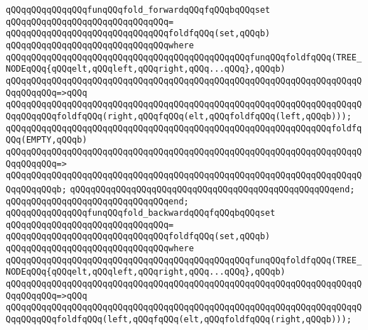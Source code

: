 \verb|qQQqqQQqqQQqqQQqfunqQQqfold_forwardqQQqfqQQqbqQQqset|\newline
\verb|qQQqqQQqqQQqqQQqqQQqqQQqqQQqqQQq=|\newline
\verb|qQQqqQQqqQQqqQQqqQQqqQQqqQQqqQQqfoldfqQQq(set,qQQqb)|\newline
\verb|qQQqqQQqqQQqqQQqqQQqqQQqqQQqqQQqwhere|\newline
\verb|qQQqqQQqqQQqqQQqqQQqqQQqqQQqqQQqqQQqqQQqqQQqqQQqfunqQQqfoldfqQQq(TREE_NODEqQQq{qQQqelt,qQQqleft,qQQqright,qQQq...qQQq},qQQqb)|\newline
\verb|qQQqqQQqqQQqqQQqqQQqqQQqqQQqqQQqqQQqqQQqqQQqqQQqqQQqqQQqqQQqqQQqqQQqqQQqqQQqqQQq=>qQQq|\newline
\verb|qQQqqQQqqQQqqQQqqQQqqQQqqQQqqQQqqQQqqQQqqQQqqQQqqQQqqQQqqQQqqQQqqQQqqQQqqQQqqQQqfoldfqQQq(right,qQQqfqQQq(elt,qQQqfoldfqQQq(left,qQQqb)));|\newline
\newline
\verb|qQQqqQQqqQQqqQQqqQQqqQQqqQQqqQQqqQQqqQQqqQQqqQQqqQQqqQQqqQQqqQQqfoldfqQQq(EMPTY,qQQqb)|\newline
\verb|qQQqqQQqqQQqqQQqqQQqqQQqqQQqqQQqqQQqqQQqqQQqqQQqqQQqqQQqqQQqqQQqqQQqqQQqqQQqqQQq=>|\newline
\verb|qQQqqQQqqQQqqQQqqQQqqQQqqQQqqQQqqQQqqQQqqQQqqQQqqQQqqQQqqQQqqQQqqQQqqQQqqQQqqQQqb;|\newline
\verb|qQQqqQQqqQQqqQQqqQQqqQQqqQQqqQQqqQQqqQQqqQQqqQQqqQQqend;|\newline
\verb|qQQqqQQqqQQqqQQqqQQqqQQqqQQqqQQqend;|\newline
\newline
\verb|qQQqqQQqqQQqqQQqfunqQQqfold_backwardqQQqfqQQqbqQQqset|\newline
\verb|qQQqqQQqqQQqqQQqqQQqqQQqqQQqqQQq=|\newline
\verb|qQQqqQQqqQQqqQQqqQQqqQQqqQQqqQQqfoldfqQQq(set,qQQqb)|\newline
\verb|qQQqqQQqqQQqqQQqqQQqqQQqqQQqqQQqwhere|\newline
\verb|qQQqqQQqqQQqqQQqqQQqqQQqqQQqqQQqqQQqqQQqqQQqqQQqfunqQQqfoldfqQQq(TREE_NODEqQQq{qQQqelt,qQQqleft,qQQqright,qQQq...qQQq},qQQqb)|\newline
\verb|qQQqqQQqqQQqqQQqqQQqqQQqqQQqqQQqqQQqqQQqqQQqqQQqqQQqqQQqqQQqqQQqqQQqqQQqqQQqqQQq=>qQQq|\newline
\verb|qQQqqQQqqQQqqQQqqQQqqQQqqQQqqQQqqQQqqQQqqQQqqQQqqQQqqQQqqQQqqQQqqQQqqQQqqQQqqQQqfoldfqQQq(left,qQQqfqQQq(elt,qQQqfoldfqQQq(right,qQQqb)));|\newline
\newline
